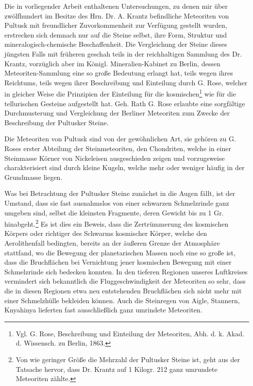 \documentclass[a4paper, 11pt, oneside, german]{article}
\begin{document}
Die in vorliegender Arbeit enthaltenen Untersuchungen, zu denen mir über zwölfhundert im Besitze des Hrn. Dr. A. Krantz befindliche Meteoriten von Pultusk mit freundlicher Zuvorkommenheit zur Verfügung gestellt wurden, erstrecken sich demnach nur auf die Steine selbst, ihre Form, Struktur und mineralogisch-chemische Beschaffenheit. Die Vergleichung der Steine dieses jüngsten Falls mit früheren geschah teils in der reichhaltigen Sammlung des Dr. Krantz, vorzüglich aber im Königl. Mineralien-Kabinet zu Berlin, dessen Meteoriten-Sammlung eine so große Bedeutung erlangt hat, teils wegen ihres Reichtums, teils wegen ihrer Beschreibung und Einteilung durch G. Rose, welcher in gleicher Weise die Prinzipien der Einteilung für die kosmischen\footnote{Vgl. G. Rose, Beschreibung und Einteilung der Meteoriten, Abh. d. k. Akad. d. Wissensch. zu Berlin, 1863.} wie für die tellurischen Gesteine aufgestellt hat. Geh. Rath G. Rose erlaubte eine sorgfältige Durchmusterung und Vergleichung der Berliner Meteoriten zum Zwecke der Beschreibung der Pultusker Steine.

Die Meteoriten von Pultusk sind von der gewöhnlichen Art, sie gehören zu G. Roses erster Abteilung der Steinmeteoriten, den Chondriten, welche in einer Steinmasse Körner von Nickeleisen ausgeschieden zeigen und vorzugsweise charakterisiert sind durch kleine Kugeln, welche mehr oder weniger häufig in der Grundmasse liegen.

Was bei Betrachtung der Pultusker Steine zunächst in die Augen fällt, ist der Umstand, dass sie fast ausnahmslos von einer schwarzen Schmelzrinde ganz umgeben sind, selbst die kleinsten Fragmente, deren Gewicht bis zu 1 Gr. hinabgeht.\footnote{Von wie geringer Größe die Mehrzahl der Pultusker Steine ist, geht aus der Tatsache hervor, dass Dr. Krantz auf 1 Kilogr. 212 ganz umrundete Meteoriten zählte.} Es ist dies ein Beweis, dass die Zertrümmerung des kosmischen Körpers oder richtiger des Schwarms kosmischer Körper, welche den Aerolithenfall bedingten, bereits an der äußeren Grenze der Atmosphäre stattfand, wo die Bewegung der planetarischen Massen noch eine so große ist, dass die Bruchflächen bei Vernichtung jener kosmischen Bewegung mit einer Schmelzrinde sich bedecken konnten. In den tieferen Regionen unseres Luftkreises vermindert sich bekanntlich die Fluggeschwindigkeit der Meteoriten so sehr, dass die in diesen Regionen etwa neu entstehenden Bruchflächen sich nicht mehr mit einer Schmelzhülle bekleiden können. Auch die Steinregen von Aigle, Stannern, Knyahinya lieferten fast ausschließlich ganz umrindete Meteoriten.
\end{document}
